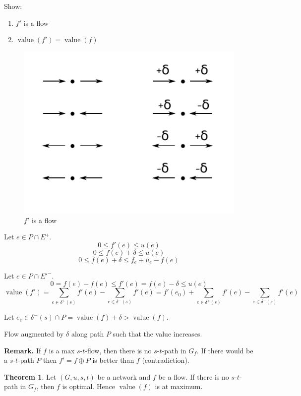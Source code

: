 \documentclass[a4paper]{article}
\theoremstyle{definition}
\newtheorem{theorem}{Theorem}
\newcommand{\gath}[2]{$#1$-$#2$-path} %
\newcommand{\flow}[2]{$#1$-$#2$-flow}
\begin{document}
Show:
\begin{enumerate}
  \item $f'$ is a flow
  \item $\operatorname{value}(f') = \operatorname{value}(f)$
\end{enumerate}

\begin{figure}[ht]
 \begin{center}
  \includegraphics{img/f_is_a_flow.pdf}
  \caption{$f'$ is a flow}
 \end{center}
\end{figure}

Let $e \in P \cap E^+$.
\[
  0 \leq f'(e) \leq u(e)
\] \[
  0 \leq f(e) + \delta \leq u(e)
\] \[
  0 \leq f(e) + \delta \leq f_e + u_e - f(e)
\]

Let $e \in P \cap E'^-$.
\[
  0 = f(e) - f(e) \leq f'(e) = f(e) - \delta \leq u(e)
\] \[
  \operatorname{value}(f')
    = \sum_{e \in \delta^+(s)} f'(e) - \sum_{e \in \delta^-(s)} f'(e)
    = f'(e_0) + \sum_{e \in \delta^+(s)} f'(e) - \sum_{e \in \delta^-(s)} f'(e)
\]

Let $e_e \in \delta^-(s) \cap P = \operatorname{value}(f) + \delta > \operatorname{value}(f)$.

\begin{center}
  Flow augmented by $\delta$ along path $P$ such that the value increases.
\end{center}

\textbf{Remark.}
  If $f$ is a max \flow st, then there is no \gath st in $G_f$.
  If there would be a \gath st $P$ then $f' = f \oplus P$ is better than $f$ (contradiction).

\begin{theorem}\label{lemma-4.3}
  Let $(G, u, s, t)$ be a network and $f$ be a flow. If there is no \gath st in $G_f$,
  then $f$ is optimal. Hence $\operatorname{value}(f)$ is at maximum.
\end{theorem}
\end{document}
